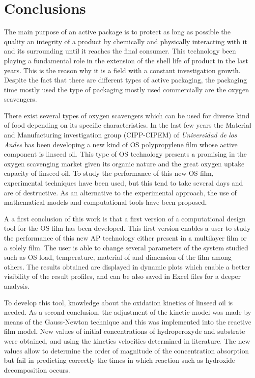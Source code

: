  \section{Conclusions}
The main purpose of an active package is to protect as long as possible the quality an integrity of a product by chemically and physically interacting with it and its surrounding until it reaches the final consumer. This technology been playing a fundamental role in the extension of the shell life of product in the last years. This is the reason why it is a field with a constant investigation growth. Despite the fact that there are different types of active packaging, the packaging time mostly used the type of packaging mostly used commercially are the oxygen scavengers. 

There exist several types of oxygen scavengers which can be used for  diverse kind of food depending on its specific characteristics. In the last few years the Material and Manufacturing investigation group  (CIPP-CIPEM) of \textit{Universidad de los Andes} has been developing a new kind of OS polypropylene film whose active component is linseed oil. This type of OS technology presents a promising in the oxygen scavenging market given its organic nature and the great oxygen uptake capacity of linseed oil. To study the performance of this new OS film,  experimental techniques have been used, but this tend to take several days and are of destructive. As an alternative to the experimental approach, the use of mathematical models and computational tools have been proposed.
 
A a first conclusion of this work is that a first version of a computational design tool for the OS film has been developed. This first version enables a user to study the performance of this new AP technology either present in a multilayer film or a solely film. The user is able to change several parameters of the system studied such as OS load, temperature, material of and dimension of the film among others. The results obtained are displayed in dynamic plots which enable a better visibility of the result profiles, and can be also saved in Excel files for a deeper analysis.

To develop this tool, knowledge about the oxidation kinetics of linseed oil is needed. As a second conclusion, the adjustment of the kinetic model was made by means of the Gauss-Newton technique and this was implemented into the reactive film model. New values of initial concentrations of hydroperoxyde and substrate were obtained, and using the kinetics velocities determined in literature. The new values allow to determine the order of magnitude of the concentration absorption but fail in predicting correctly the times in which reaction such as hydroxide decomposition occurs. 

